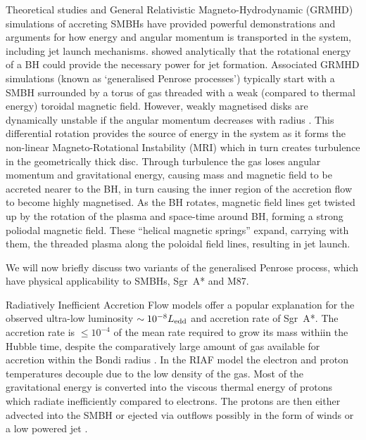 Theoretical studies and General Relativistic Magneto-Hydrodynamic (GRMHD) simulations of accreting SMBHs \citep[e.g.][]{Gammie_2003,Narayan_2012,Moscibrodzka_20133} have provided powerful demonstrations and arguments for how energy and angular momentum is transported in the system, including jet launch mechanisms. \citet{Penrose_1969} showed analytically that the rotational energy of a BH could provide the necessary power for jet formation. Associated GRMHD simulations (known as `generalised Penrose processes') typically start with a SMBH surrounded by a torus of gas threaded with a weak (compared to thermal energy) toroidal magnetic field. However, weakly magnetised disks are dynamically unstable if the angular momentum decreases with radius \citep{Balbus_1998}. This differential rotation provides the source of energy in the system as it forms the non-linear Magneto-Rotational Instability (MRI) which in turn creates turbulence in the geometrically thick disc. Through turbulence the gas loses angular momentum and gravitational energy, causing mass and magnetic field to be accreted nearer to the BH, in turn causing the inner region of the accretion flow to become highly magnetised. As the BH rotates, magnetic field lines get twisted up by the rotation of the plasma and space-time around BH, forming a strong poliodal magnetic  field. These ``helical magnetic springs'' \citep{Narayan_2014} expand, carrying with them, the threaded plasma along the poloidal field lines, resulting in jet launch.  



We will now briefly discuss two variants of the generalised Penrose process, which have physical applicability to SMBHs, Sgr~A* and M87.
 
Radiatively Inefficient Accretion Flow \citep[(RIAF),][]{Narayan_1995,Yuan_2003} models offer a popular explanation for the observed ultra-low luminosity $\sim 10^{-8} L_{\rm edd}$ and accretion rate of Sgr~A*. The accretion rate is $\le 10^{-4}$ of the mean rate required to grow its mass withiin the Hubble time, despite the comparatively large amount of gas available for accretion within the Bondi radius \citep{Goddi_2016}. In the RIAF model the electron and proton temperatures decouple due to the low density of the gas. Most of the gravitational energy is converted into the viscous thermal energy of protons which radiate inefficiently compared to electrons. The protons are then either advected into the SMBH \citep{Narayan_1998} or ejected via outflows possibly in the form of winds or a low powered jet \citep{Blandford_1999}. 


